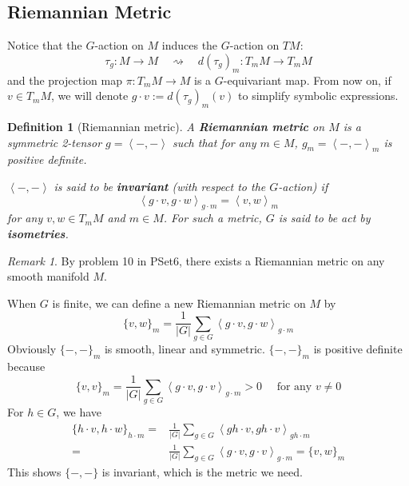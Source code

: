 \documentclass[reqno,11pt]{amsart}
\numberwithin{equation}{section}
\theoremstyle{plain}
\newtheorem{defn}[theorem]{Definition}
\theoremstyle{plain}
\numberwithin{equation}{section}
\theoremstyle{remark}
\newtheorem{remark}[theorem]{Remark}
\begin{document}
\subsection{Riemannian Metric}
Notice that the $G$-action on $M$ induces the $G$-action on $TM$:
$$\tau_g:M \longrightarrow M \quad\rightsquigarrow\quad d(\tau_g)_m:T_mM \longrightarrow T_mM$$
and the projection map $\pi:T_mM \rightarrow M$ is a $G$-equivariant map. From now on, if $v \in T_mM$, we will denote $g\cdot v:=d(\tau_g)_m(v)$ to simplify symbolic expressions.
\begin{defn}[Riemannian metric]
	A \textbf{Riemannian metric} on $M$ is a symmetric 2-tensor $g=\left<-,-\right>$ such that for any $m \in M$, $g_m=\left<-,-\right>_m$ is positive definite.
	
	$\left<-,-\right>$ is said to be \textbf{invariant} (with respect to the $G$-action) if
	$$\left<g\cdot v,g\cdot w\right>_{g \cdot m}=\left<v,w\right>_m$$
	for any $v,w \in T_mM$ and $m \in M$. For such a metric, $G$ is said to be act by \textbf{isometries}.
\end{defn}
\begin{remark}
	By problem 10 in PSet6, there exists a Riemannian metric on any smooth manifold $M$.
\end{remark}
When $G$ is finite, we can define a new Riemannian metric on $M$ by
\begin{equation}
\{v,w\}_m=\frac{1}{|G|}\sum_{g \in G} \left<g \cdot v,g\cdot w\right>_{g\cdot m}
\label{eq:riemet}
\end{equation}
Obviously $\{-,-\}_m$ is smooth, linear and symmetric. $\{-,-\}_m$ is positive definite because
 $$\{v,v\}_m=\frac{1}{|G|}\sum_{g \in G} \left<g \cdot v,g\cdot v\right>_{g\cdot m}>0 \quad \text{ for any } v \neq 0$$
For $h \in G$, we have
\begin{equation*}
\begin{aligned}
	\{h\cdot v,h \cdot w\}_{h \cdot m}=&\frac{1}{|G|}\sum_{g \in G} \left<gh \cdot v,gh\cdot v\right>_{gh\cdot m}\\
	=&\frac{1}{|G|}\sum_{g \in G} \left<g \cdot v,g\cdot v\right>_{g\cdot m}=\{v,w\}_m
\end{aligned}
\end{equation*}
This shows $\{-,-\}$ is invariant, which is the metric we need.
\end{document}
